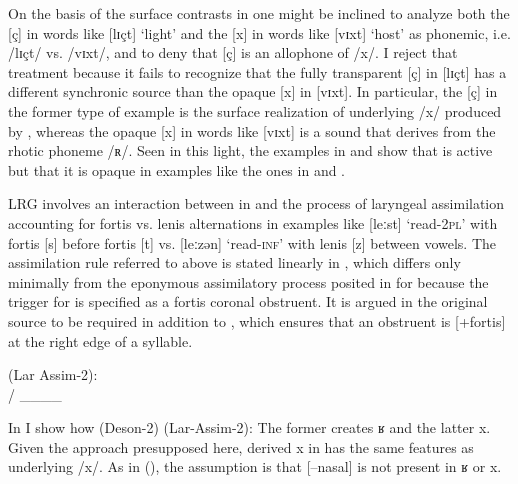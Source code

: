 On the basis of the surface contrasts in  one might be inclined to analyze both the [ç] in words like [lɪçt] ‘light’ and the [x] in words like [vɪxt] ‘host’ as phonemic, i.e. /lɪçt/ vs. /vɪxt/, and to deny that [ç] is an allophone of /x/. I reject that treatment because it fails to recognize that the fully transparent [ç] in [lɪçt] has a different synchronic source than the opaque [x] in [vɪxt]. In particular, the [ç] in the former type of example is the surface realization of underlying /x/ produced by , whereas the opaque [x] in words like [vɪxt] is a sound that derives from the rhotic phoneme /ʀ/. Seen in this light, the examples in  and  show that  is active but that it is opaque in examples like the ones in  and .

LRG involves an interaction between  in  and the process of laryngeal assimilation accounting for fortis vs. lenis alternations in examples like [leːst] ‘read-\textsc{2pl}’ with fortis [s] before fortis [t] vs. [leːzən] ‘read-\textsc{inf}’ with lenis [z] between vowels. The assimilation rule referred to above is stated linearly in , which differs only minimally from the eponymous assimilatory process posited  in  for  because the trigger for  is specified as a fortis coronal obstruent. It is argued in the original source to be required in addition to , which ensures that an obstruent is  [+fortis] at the right edge of a syllable.

\ea%
  \label{ex:5:26}
   (Lar Assim-2):\smallskip\\
   / \_\_\_\_ 
\z 

In  I show how  (Deson-2)   (Lar-Assim-2): The former creates {\textbar}ʁ{\textbar} and the latter {\textbar}x{\textbar}. Given the approach presupposed here, derived {\textbar}x{\textbar} in  has the same features as underlying /x/. As in  (), the assumption is that [--nasal] is not present in {\textbar}ʁ{\textbar} or {\textbar}x{\textbar}.

